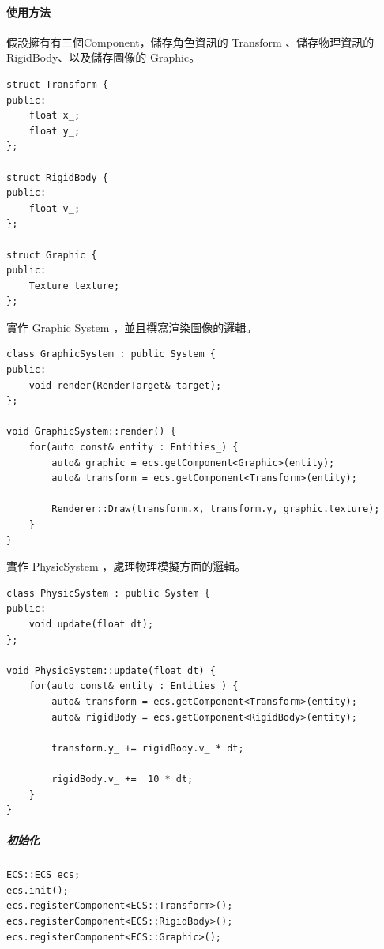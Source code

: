 \newpage

\paragraph{使用方法}

假設擁有有三個Component，儲存角色資訊的 Transform 、儲存物理資訊的 RigidBody、以及儲存圖像的 Graphic。

\begin{lstlisting}
struct Transform {
public:
    float x_;
    float y_;
};

struct RigidBody {
public:
    float v_;
};

struct Graphic {
public:
    Texture texture;
};
\end{lstlisting}

實作 Graphic System ，並且撰寫渲染圖像的邏輯。

\begin{lstlisting}
class GraphicSystem : public System {
public:
    void render(RenderTarget& target);
};

void GraphicSystem::render() {
    for(auto const& entity : Entities_) {
        auto& graphic = ecs.getComponent<Graphic>(entity);
        auto& transform = ecs.getComponent<Transform>(entity);
        
        Renderer::Draw(transform.x, transform.y, graphic.texture);
    }
}
\end{lstlisting}

\newpage

實作 PhysicSystem ，處理物理模擬方面的邏輯。

\begin{lstlisting}
class PhysicSystem : public System {
public:
    void update(float dt);
};

void PhysicSystem::update(float dt) {
    for(auto const& entity : Entities_) {
        auto& transform = ecs.getComponent<Transform>(entity);
        auto& rigidBody = ecs.getComponent<RigidBody>(entity);

        transform.y_ += rigidBody.v_ * dt;

        rigidBody.v_ +=  10 * dt;
    }
}
\end{lstlisting}

\subparagraph{初始化}

\begin{lstlisting}
ECS::ECS ecs;
ecs.init();
ecs.registerComponent<ECS::Transform>();
ecs.registerComponent<ECS::RigidBody>();
ecs.registerComponent<ECS::Graphic>();
\end{lstlisting}


